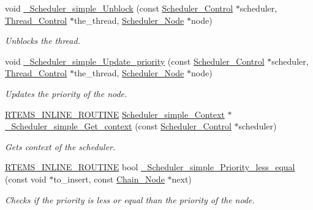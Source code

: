 \begin{DoxyCompactItemize}
void \mbox{\hyperlink{group__RTEMSScoreSchedulerSimple_ga5e15d6514580c3184e93d3dc935d0a6f}{\+\_\+\+Scheduler\+\_\+simple\+\_\+\+Unblock}} (const \mbox{\hyperlink{struct__Scheduler__Control}{Scheduler\+\_\+\+Control}} $\ast$scheduler, \mbox{\hyperlink{struct__Thread__Control}{Thread\+\_\+\+Control}} $\ast$the\+\_\+thread, \mbox{\hyperlink{structScheduler__Node}{Scheduler\+\_\+\+Node}} $\ast$node)
\begin{DoxyCompactList}\small\item\em Unblocks the thread. \end{DoxyCompactList}\item 
void \mbox{\hyperlink{group__RTEMSScoreSchedulerSimple_gacb4b8fc8ec7b055afb904072c38f9fc5}{\+\_\+\+Scheduler\+\_\+simple\+\_\+\+Update\+\_\+priority}} (const \mbox{\hyperlink{struct__Scheduler__Control}{Scheduler\+\_\+\+Control}} $\ast$scheduler, \mbox{\hyperlink{struct__Thread__Control}{Thread\+\_\+\+Control}} $\ast$the\+\_\+thread, \mbox{\hyperlink{structScheduler__Node}{Scheduler\+\_\+\+Node}} $\ast$node)
\begin{DoxyCompactList}\small\item\em Updates the priority of the node. \end{DoxyCompactList}\item 
\mbox{\hyperlink{group__RTEMSScoreBaseDefs_gac216239df231d5dbd15e3520b0b9313f}{R\+T\+E\+M\+S\+\_\+\+I\+N\+L\+I\+N\+E\+\_\+\+R\+O\+U\+T\+I\+NE}} \mbox{\hyperlink{structScheduler__simple__Context}{Scheduler\+\_\+simple\+\_\+\+Context}} $\ast$ \mbox{\hyperlink{group__RTEMSScoreSchedulerSimple_gaa06ad2d8f5cb1a0aa56efa757f40768e}{\+\_\+\+Scheduler\+\_\+simple\+\_\+\+Get\+\_\+context}} (const \mbox{\hyperlink{struct__Scheduler__Control}{Scheduler\+\_\+\+Control}} $\ast$scheduler)
\begin{DoxyCompactList}\small\item\em Gets context of the scheduler. \end{DoxyCompactList}\item 
\mbox{\hyperlink{group__RTEMSScoreBaseDefs_gac216239df231d5dbd15e3520b0b9313f}{R\+T\+E\+M\+S\+\_\+\+I\+N\+L\+I\+N\+E\+\_\+\+R\+O\+U\+T\+I\+NE}} bool \mbox{\hyperlink{group__RTEMSScoreSchedulerSimple_ga7ab1b2107fa8ab8825cb6c3488250296}{\+\_\+\+Scheduler\+\_\+simple\+\_\+\+Priority\+\_\+less\+\_\+equal}} (const void $\ast$to\+\_\+insert, const \mbox{\hyperlink{group__RTEMSScoreChain_ga0dd4bfcca1ac7f90de2842e447846d3d}{Chain\+\_\+\+Node}} $\ast$next)
\begin{DoxyCompactList}\small\item\em Checks if the priority is less or equal than the priority of the node. \end{DoxyCompactList}\item 

\end{DoxyCompactItemize}
